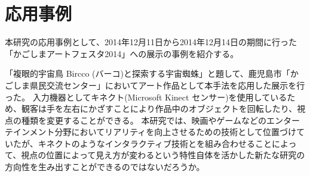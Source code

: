 \section{応用事例}
\label{SKagoshima}

本研究の応用事例として、2014年12月11日から2014年12月14日の期間に行った「かごしまアートフェスタ2014」への展示の事例を紹介する。

「複眼的宇宙鳥 Bircco (バーコ)と探索する宇宙蜘蛛」と題して、鹿児島市「かごしま県民交流センター」においてアート作品として本手法を応用した展示を行った。
入力機器としてキネクト(Microsoft Kinect センサー)を使用しているため、観客は手を左右にかざすことにより作品中のオブジェクトを回転したり、視点の種類を変更することができる。
本研究では、映画やゲームなどのエンターテインメント分野においてリアリティを向上させるための技術として位置づけていたが、キネクトのようなインタラクティブ技術とを組み合わせることによって、視点の位置によって見え方が変わるという特性自体を活かした新たな研究の方向性を生み出すことができるのではないだろうか。




